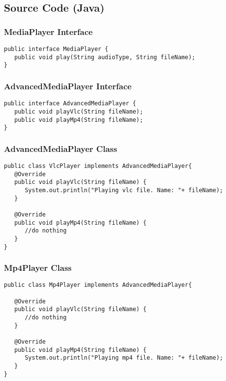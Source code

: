 \newpage
\subsection{Source Code (Java)}

\subsubsection{MediaPlayer Interface}

\begin{verbatim}
public interface MediaPlayer {
   public void play(String audioType, String fileName);
}
\end{verbatim}

\subsubsection{AdvancedMediaPlayer Interface}

\begin{verbatim}
public interface AdvancedMediaPlayer {	
   public void playVlc(String fileName);
   public void playMp4(String fileName);
}
\end{verbatim}

\subsubsection{AdvancedMediaPlayer Class}

\begin{verbatim}
public class VlcPlayer implements AdvancedMediaPlayer{
   @Override
   public void playVlc(String fileName) {
      System.out.println("Playing vlc file. Name: "+ fileName);		
   }

   @Override
   public void playMp4(String fileName) {
      //do nothing
   }
}
\end{verbatim}

\subsubsection{Mp4Player Class}

\begin{verbatim}
public class Mp4Player implements AdvancedMediaPlayer{

   @Override
   public void playVlc(String fileName) {
      //do nothing
   }

   @Override
   public void playMp4(String fileName) {
      System.out.println("Playing mp4 file. Name: "+ fileName);		
   }
}
\end{verbatim}

